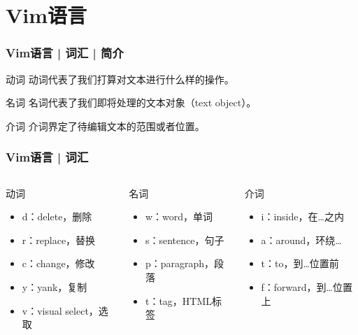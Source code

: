 \section{Vim语言}
\begin{frame}
  \frametitle{Vim语言 | 词汇 | 简介}
  \begin{block}{动词}
    动词代表了我们打算对文本进行什么样的操作。
  \end{block}
  \pause
  \begin{block}{名词}
    名词代表了我们即将处理的文本对象（text object）。
  \end{block}
  \pause
  \begin{block}{介词}
    介词界定了待编辑文本的范围或者位置。
  \end{block}
\end{frame}

\begin{frame}
  \frametitle{Vim语言 | 词汇}
  \begin{columns}
  \begin{block}{动词}
    \begin{itemize}
      \item d：delete，删除
      \item r：replace，替换
      \item c：change，修改
      \item y：yank，复制
      \item v：visual select，选取
    \end{itemize}
  \end{block}
  \pause
   \begin{block}{名词}
    \begin{itemize}
      \item w：word，单词
      \item s：sentence，句子
      \item p：paragraph，段落
      \item t：tag，HTML标签
    \end{itemize}
   \end{block}
  \pause
  \begin{block}{介词}
    \begin{itemize}
      \item i：inside，在…之内
      \item a：around，环绕…
      \item t：to，到…位置前
      \item f：forward，到…位置上
    \end{itemize}
  \end{block}
 \end{columns}
\end{frame}

